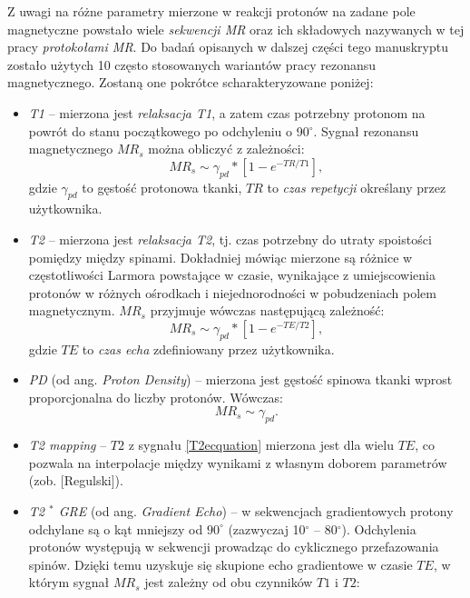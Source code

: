 Z uwagi na różne parametry mierzone w reakcji protonów na zadane pole magnetyczne powstało wiele \textit{sekwencji MR} oraz ich składowych nazywanych w tej pracy \textit{protokołami MR}. Do badań opisanych w dalszej części tego manuskryptu zostało użytych 10 często stosowanych wariantów pracy rezonansu magnetycznego. Zostaną one pokrótce scharakteryzowane poniżej:
\begin{itemize}
	\item \textit{T1} -- mierzona jest \textit{relaksacja T1}, a zatem czas potrzebny protonom na powrót do stanu początkowego po odchyleniu o 90$^\circ$. Sygnał rezonansu magnetycznego $MR_s$ można obliczyć z zależności:
	\begin{equation}
		MR_s \sim \gamma_{pd} \ast [1-e^{-TR/T1}],
	\end{equation}
	gdzie $\gamma_{pd}$ to gęstość protonowa tkanki, $TR$ to \textit{czas repetycji} określany przez użytkownika.
	\item \textit{T2} -- mierzona jest \textit{relaksacja T2}, tj. czas potrzebny do utraty spoistości pomiędzy między spinami. Dokładniej mówiąc mierzone są różnice w częstotliwości Larmora powstające w czasie, wynikające z umiejscowienia protonów w różnych ośrodkach i niejednorodności w pobudzeniach polem magnetycznym. $MR_s$ przyjmuje wówczas następującą zależność:
	\begin{equation}
	\label{T2ecquation}
	MR_s \sim \gamma_{pd} \ast [1-e^{-TE/T2}],
	\end{equation}
	gdzie $TE$ to \textit{czas echa} zdefiniowany przez użytkownika.
	\item \textit{PD} (od ang. \textit{Proton Density}) -- mierzona jest gęstość spinowa tkanki wprost proporcjonalna do liczby protonów. Wówczas:
	\begin{equation}
	MR_s \sim \gamma_{pd}.
	\end{equation}
	\item \textit{T2 mapping} -- $T2$ z sygnału \ref{T2ecquation} mierzona jest dla wielu $TE$, co pozwala na interpolacje między wynikami z własnym doborem parametrów (zob. [Regulski]).
	\item \textit{T2 $^\ast$ GRE} (od ang. \textit{Gradient Echo}) -- w sekwencjach gradientowych protony odchylane są o kąt mniejszy od $90^\circ$ (zazwyczaj 10$^\circ$ -- 80$^\circ$). Odchylenia protonów występują w sekwencji prowadząc do cyklicznego przefazowania spinów. Dzięki temu uzyskuje się skupione echo gradientowe w czasie $TE$, w którym sygnał $MR_s$ jest zależny od obu czynników $T1$ i $T2$:
	\begin{equation}

\end{equation}
\end{itemize}

